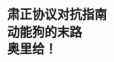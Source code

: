 \documentclass[11pt]{article}
\begin{document}
    \begin{titlepage}
        \begin{center}
            \vspace*{1cm}
            \Large{\textbf{肃正协议对抗指南}}\\[2mm]
            \large{\textbf{动能狗的末路}}\\
            \LARGE{\textbf{奥里给！}}
        \end{center}
    \end{titlepage}
 
    
\end{document}
